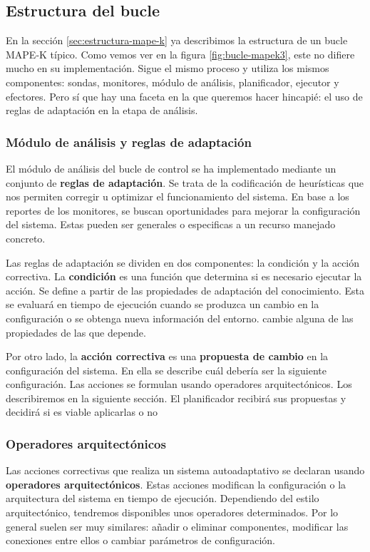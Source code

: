 \subsection{Estructura del bucle}

En la sección \ref{sec:estructura-mape-k} ya describimos la estructura de un bucle MAPE-K típico. Como vemos ver en la figura \ref{fig:bucle-mapek3}, este no difiere mucho en su implementación. Sigue el mismo proceso y utiliza los mismos componentes: sondas, monitores, módulo de análisis, planificador, ejecutor y efectores. Pero sí que hay una faceta en la que queremos hacer hincapié: el uso de reglas de adaptación en la etapa de análisis.

\subsubsection{Módulo de análisis y reglas de adaptación}

El módulo de análisis del bucle de control se ha implementado mediante un conjunto de \textbf{reglas de adaptación}. Se trata de la codificación de heurísticas que nos permiten corregir u optimizar el funcionamiento del sistema. En base a los reportes de los monitores, se buscan oportunidades para mejorar la configuración del sistema. Estas pueden ser generales o especificas a un recurso manejado concreto.

Las reglas de adaptación se dividen en dos componentes: la condición y la acción correctiva. La \textbf{condición} es una función que determina si es necesario ejecutar la acción. Se define a partir de las propiedades de adaptación del conocimiento. Esta se evaluará en tiempo de ejecución cuando se produzca un cambio en la configuración o se obtenga nueva información del entorno. cambie alguna de las propiedades de las que depende.

Por otro lado, la \textbf{acción correctiva} es una \textbf{propuesta de cambio} en la configuración del sistema. En ella se describe cuál debería ser la siguiente configuración. Las acciones se formulan usando operadores arquitectónicos. Los describiremos en la siguiente sección. El planificador recibirá sus propuestas y decidirá si es viable aplicarlas o no

\subsubsection{Operadores arquitectónicos}

Las acciones correctivas que realiza un sistema autoadaptativo se declaran usando \textbf{operadores arquitectónicos}. \cite{garlanIncreasingSystemDependability2003} Estas acciones modifican la configuración o la arquitectura del sistema en tiempo de ejecución. Dependiendo del estilo arquitectónico, tendremos disponibles unos operadores determinados. Por lo general suelen ser muy similares: añadir o eliminar componentes, modificar las conexiones entre ellos o cambiar parámetros de configuración.

